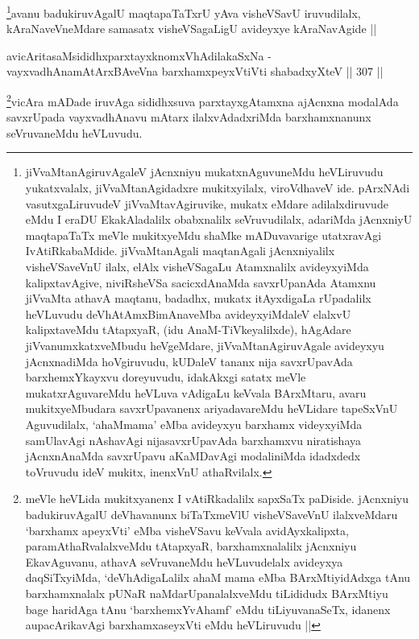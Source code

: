 \begin{artha}
\footnote{jiVvaMtanAgiruvAgaleV jAcnxniyu mukatxnAguvuneMdu
  heVLiruvudu yukatxvalalx, jiVvaMtanAgidadxre mukitxyilalx,
  viroVdhaveV ide. pArxNAdi vasutxgaLiruvudeV jiVvaMtavAgiruvike,
  mukatx eMdare adilalxdiruvude eMdu I eraDU EkakAladalilx obabxnalilx
  seVruvudilalx, adariMda jAcnxniyU maqtapaTaTx meVle mukitxyeMdu
  shaMke mADuvavarige utatxravAgi IvAtiRkabaMdide. jiVvaMtanAgali
  maqtanAgali jAcnxniyalilx visheVSaveVnU ilalx, elAlx visheVSagaLu
  Atamxnalilx avideyxyiMda kalipxtavAgive, niviRsheVSa sacicxdAnaMda
  savxrUpanAda Atamxnu jiVvaMta athavA maqtanu, badadhx, mukatx
  itAyxdigaLa rUpadalilx heVLuvudu deVhAtAmxBimAnaveMba
  avideyxyiMdaleV elalxvU kalipxtaveMdu tAtapxyaR, (idu
  AnaM-TiVkeyalilxde), hAgAdare jiVvanumxkatxveMbudu heVgeMdare,
  jiVvaMtanAgiruvAgale avideyxyu jAcnxnadiMda hoVgiruvudu, kUDaleV
  tananx nija savxrUpavAda barxhemxYkayxvu doreyuvudu, idakAkxgi
  satatx meVle mukatxrAguvareMdu heVLuva vAdigaLu keVvala BArxMtaru,
  avaru mukitxyeMbudara savxrUpavanenx ariyadavareMdu heVLidare
  tapeSxVnU Aguvudilalx, `ahaMmama' eMba avideyxyu barxhamx
  videyxyiMda samUlavAgi nAshavAgi nijasavxrUpavAda barxhamxvu
  niratishaya jAcnxnAnaMda savxrUpavu aKaMDavAgi modaliniMda idadxdedx
  toVruvudu ideV mukitx, inenxVnU athaRvilalx.}avanu badukiruvAgalU maqtapaTaTxrU yAva visheVSavU
iruvudilalx, kAraNaveVneMdare samasatx visheVSagaLigU avideyxye
kAraNavAgide ||
\end{artha}

\begin{shl}
avicAritasaMsididhxparxtayxknomxVhAdilakaSxNa - \\
vayxvadhAnamAtArxBAveVna barxhamxpeyxVtiVti shabadxyXteV ||  307 ||  
\end{shl}

\begin{artha}
\footnote{meVle heVLida mukitxyanenx I vAtiRkadalilx sapxSaTx
  paDiside. jAcnxniyu badukiruvAgalU deVhavanunx biTaTxmeVlU
  visheVSaveVnU ilalxveMdaru `barxhamx apeyxVti' eMba visheVSavu
  keVvala avidAyxkalipxta, paramAthaRvalalxveMdu tAtapxyaR,
  barxhamxnalalilx jAcnxniyu EkavAguvanu, athavA seVruvaneMdu
  heVLuvudelalx avideyxya daqSiTxyiMda, `deVhAdigaLalilx ahaM mama
  eMba BArxMtiyidAdxga tAnu barxhamxnalalx pUNaR naMdarUpanalalxveMdu
  tiLididudx BArxMtiyu bage haridAga tAnu `barxhemxYvAhamf' eMdu
  tiLiyuvanaSeTx, idanenx aupacArikavAgi barxhamxaseyxVti eMdu
  heVLiruvudu ||}vicAra mADade iruvAga sididhxsuva parxtayxgAtamxna ajAcnxna
modalAda savxrUpada vayxvadhAnavu mAtarx ilalxvAdadxriMda
barxhamxnanunx seVruvaneMdu heVLuvudu.
\end{artha}

